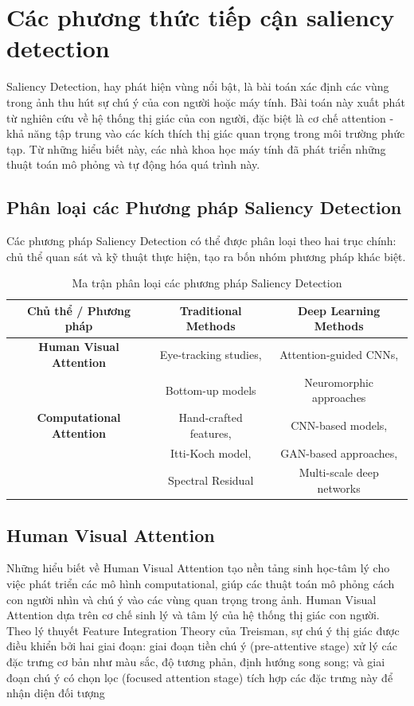\section{Các phương thức tiếp cận saliency detection}

Saliency Detection, hay phát hiện vùng nổi bật, là bài toán xác định các vùng trong ảnh thu hút sự chú ý của con người hoặc máy tính. Bài toán này xuất phát từ nghiên cứu về hệ thống thị giác của con người, đặc biệt là cơ chế attention - khả năng tập trung vào các kích thích thị giác quan trọng trong môi trường phức tạp. Từ những hiểu biết này, các nhà khoa học máy tính đã phát triển những thuật toán mô phỏng và tự động hóa quá trình này.

\subsection{Phân loại các Phương pháp Saliency Detection}

Các phương pháp Saliency Detection có thể được phân loại theo hai trục chính: chủ thể quan sát và kỹ thuật thực hiện, tạo ra bốn nhóm phương pháp khác biệt.

\begin{table}[h!]
    \centering
    \label{tab:saliency_classification}
    \begin{tabular}{|c|c|c|}
    \hline
    \textbf{Chủ thể / Phương pháp} & \textbf{Traditional Methods} & \textbf{Deep Learning Methods} \\
    \hline
    \textbf{Human Visual Attention} & Eye-tracking studies, & Attention-guided CNNs, \\
    & Bottom-up models & Neuromorphic approaches \\
    \hline
    \textbf{Computational Attention} & Hand-crafted features, & CNN-based models, \\
    & Itti-Koch model, & GAN-based approaches, \\
    & Spectral Residual & Multi-scale deep networks \\
    \hline
    \end{tabular}
    \caption{Ma trận phân loại các phương pháp Saliency Detection}
\end{table}

\subsection{Human Visual Attention}
Những hiểu biết về Human Visual Attention tạo nền tảng sinh học-tâm lý cho việc phát triển các mô hình computational, giúp các thuật toán mô phỏng cách con người nhìn và chú ý vào các vùng quan trọng trong ảnh. Human Visual Attention dựa trên cơ chế sinh lý và tâm lý của hệ thống thị giác con người. Theo lý thuyết Feature Integration Theory của Treisman, sự chú ý thị giác được điều khiển bởi hai giai đoạn: giai đoạn tiền chú ý (pre-attentive stage) xử lý các đặc trưng cơ bản như màu sắc, độ tương phản, định hướng song song; và giai đoạn chú ý có chọn lọc (focused attention stage) tích hợp các đặc trưng này để nhận diện đối tượng \\

